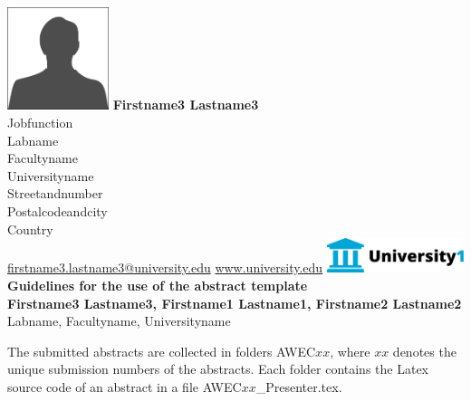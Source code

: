\label{awec:01-presenter}
\abstractpage%
%
%
%
{%
\label{photo:01-presenter}
\includegraphics[height=3cm]{figures/AWEC01_Presenter.pdf}
}
%
{%
{\bfseries Firstname3 Lastname3}\\[\authorvsep]
%
Jobfunction\\
Labname\\[\addressvsep]
Facultyname\\
Universityname\\
Streetandnumber\\
Postalcodeandcity\\
Country\\[\addressvsep]
%
\href{mailto:firstname3.lastname3@university.edu}{firstname3.lastname3@university.edu}
\href{http://www.university.edu}{www.university.edu}
}
%
{%
\includegraphics[width=4cm]{figures/AWEC01_Logo.pdf}
}
%
%
%
%
{
{\Large\bfseries
Guidelines for the use of the abstract template%
}\\[2mm]
%
%
%
{\bfseries
{}
Firstname3 Lastname3, Firstname1 Lastname1, Firstname2 Lastname2
}\\
%
%
%
Labname, Facultyname, Universityname
}
%
%
%
{
\begin{multicols}{2}
%
%
%
%
The submitted abstracts are collected in folders AWEC$xx$, where $xx$ denotes the unique submission numbers of the abstracts. Each folder contains the Latex source code of an abstract in a file AWEC$xx$\_Presenter.tex.


%
%
%
%
\mbox{}
\end{multicols}
}
